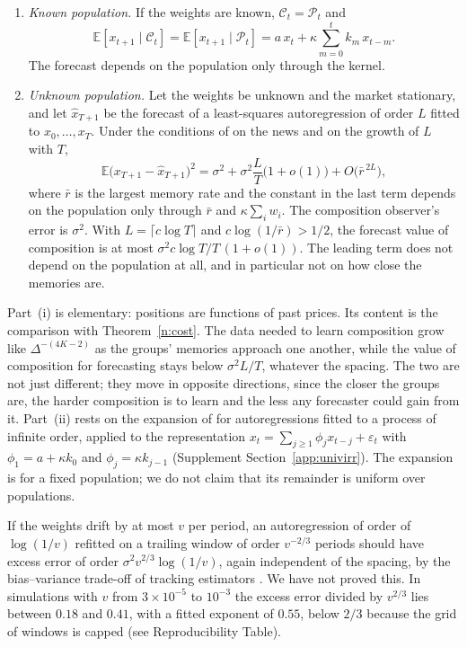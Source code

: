 \begin{theorem}\label{n:irr}
\begin{enumerate}[label=(\roman*),itemsep=1pt]
\item \emph{Known population.} If the weights are known, $\mathcal C_t=\mathcal P_t$ and
\[
\mathbb E[x_{t+1}\mid\mathcal C_t]=\mathbb E[x_{t+1}\mid\mathcal P_t]=a\,x_t+\kappa\sum_{m=0}^{t}k_m\,x_{t-m}.
\]
The forecast depends on the population only through the kernel.
\item \emph{Unknown population.} Let the weights be unknown and the market stationary, and let $\hat x_{T+1}$ be the forecast of a least-squares autoregression of order $L$ fitted to $x_0,\ldots,x_T$. Under the conditions of \citet{ingwei2003} on the news and on the growth of $L$ with $T$,
\[
\mathbb E\big(x_{T+1}-\hat x_{T+1}\big)^2=\sigma^2+\sigma^2\frac{L}{T}\big(1+o(1)\big)+O\big(\bar r^{\,2L}\big),
\]
where $\bar r$ is the largest memory rate and the constant in the last term depends on the population only through $\bar r$ and $\kappa\sum_iw_i$. The composition observer's error is $\sigma^2$. With $L=\lceil c\log T\rceil$ and $c\log(1/\bar r)>1/2$, the forecast value of composition is at most $\sigma^2c\log T/T\,(1+o(1))$. The leading term does not depend on the population at all, and in particular not on how close the memories are.
\end{enumerate}
\end{theorem}

Part~(i) is elementary: positions are functions of past prices. Its content is the comparison with Theorem~\ref{n:cost}. The data needed to learn composition grow like $\Delta^{-(4K-2)}$ as the groups' memories approach one another, while the value of composition for forecasting stays below $\sigma^2L/T$, whatever the spacing. The two are not just different; they move in opposite directions, since the closer the groups are, the harder composition is to learn and the less any forecaster could gain from it. Part~(ii) rests on the expansion of \citet{ingwei2003} for autoregressions fitted to a process of infinite order, applied to the representation $x_t=\sum_{j\ge1}\phi_jx_{t-j}+\varepsilon_t$ with $\phi_1=a+\kappa k_0$ and $\phi_j=\kappa k_{j-1}$ (Supplement Section~\ref{app:univirr}). The expansion is for a fixed population; we do not claim that its remainder is uniform over populations.

\begin{remark}
If the weights drift by at most $v$ per period, an autoregression of order of $\log(1/v)$ refitted on a trailing window of order $v^{-2/3}$ periods should have excess error of order $\sigma^2v^{2/3}\log(1/v)$, again independent of the spacing, by the bias--variance trade-off of tracking estimators \citep{guoljung1995}. We have not proved this. In simulations with $v$ from $3\times10^{-5}$ to $10^{-3}$ the excess error divided by $v^{2/3}$ lies between $0.18$ and $0.41$, with a fitted exponent of $0.55$, below $2/3$ because the grid of windows is capped (see Reproducibility Table).
\end{remark}

